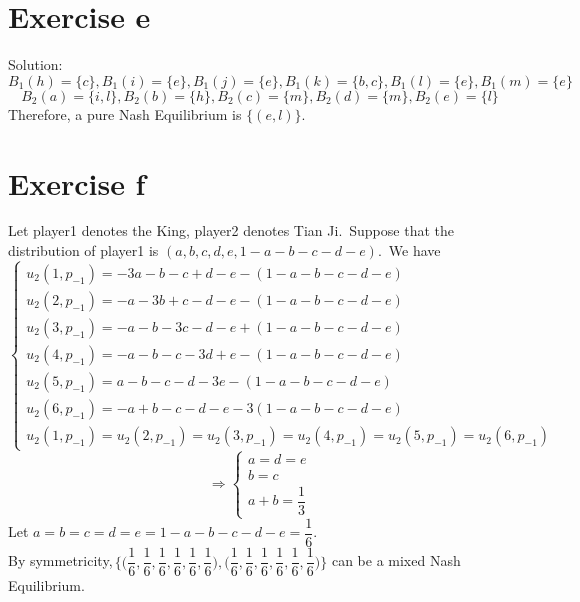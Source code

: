 \documentclass[a4papers]{ctexart}
\begin{document}
\section*{Exercise e}
\noindent Solution:
\[ B_1(h)=\{ c\},B_1(i)=\{ e\},B_1(j)=\{ e\},B_1(k)=\{ b,c\},B_1(l)=\{ e\},B_1(m)=\{ e\}\]
\[ B_2(a)=\{ i,l\},B_2(b)=\{ h \},B_2(c)=\{ m\},B_2(d)=\{ m\},B_2(e)=\{ l\}\]
Therefore, a pure Nash Equilibrium is $\{ (e,l)\}.$

\section*{Exercise f}
Let player1 denotes the King, player2 denotes Tian Ji.\,
Suppose that the distribution of player1 is $(a,b,c,d,e,1-a-b-c-d-e)$.\,
We have 
\begin{equation*}
    \begin{cases}
        u_2(1,p_{-1})=-3a-b-c+d-e-(1-a-b-c-d-e)\\
        u_2(2,p_{-1})=-a-3b+c-d-e-(1-a-b-c-d-e)\\
        u_2(3,p_{-1})=-a-b-3c-d-e+(1-a-b-c-d-e)\\
        u_2(4,p_{-1})=-a-b-c-3d+e-(1-a-b-c-d-e)\\
        u_2(5,p_{-1})=a-b-c-d-3e-(1-a-b-c-d-e)\\
        u_2(6,p_{-1})=-a+b-c-d-e-3(1-a-b-c-d-e)\\
        u_2(1,p_{-1})=u_2(2,p_{-1})=u_2(3,p_{-1})=u_2(4,p_{-1})=u_2(5,p_{-1})=u_2(6,p_{-1})
    \end{cases}
\end{equation*}
\begin{equation*}
    \Rightarrow
    \begin{cases}
        a=d=e\\b=c\\a+b=\dfrac{1}{3}
    \end{cases}
\end{equation*}
Let $a=b=c=d=e=1-a-b-c-d-e=\dfrac{1}{6}$.\\
By symmetricity,\,$\Big\{\big(\dfrac{1}{6},\dfrac{1}{6},\dfrac{1}{6},\dfrac{1}{6},\dfrac{1}{6},\dfrac{1}{6}\big),\big(\dfrac{1}{6},\dfrac{1}{6},\dfrac{1}{6},\dfrac{1}{6},\dfrac{1}{6},\dfrac{1}{6}\big)\Big\}$
can be a mixed Nash Equilibrium.
\end{document}
